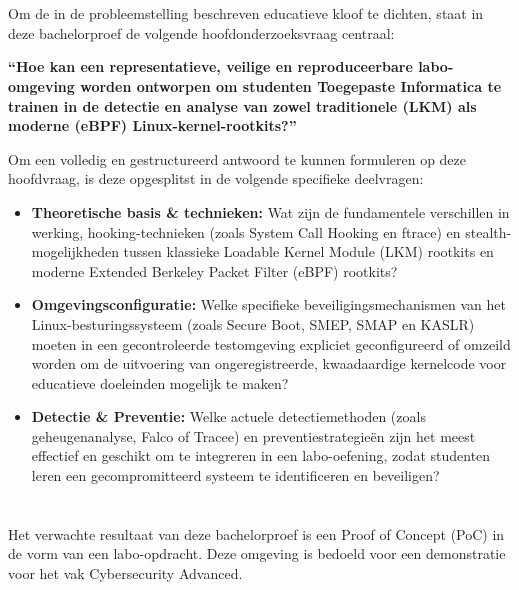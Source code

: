 \section{}%
\label{sec:onderzoeksvraag}

Om de in de probleemstelling beschreven educatieve kloof te dichten, staat in deze bachelorproef de volgende hoofdonderzoeksvraag centraal:

\textbf{``Hoe kan een representatieve, veilige en reproduceerbare labo-omgeving worden ontworpen om studenten Toegepaste Informatica te trainen in de detectie en analyse van zowel traditionele (LKM) als moderne (eBPF) Linux-kernel-rootkits?''}

Om een volledig en gestructureerd antwoord te kunnen formuleren op deze hoofdvraag, is deze opgesplitst in de volgende specifieke deelvragen:
\begin{itemize}
    \item \textbf{Theoretische basis \& technieken:} Wat zijn de fundamentele verschillen in werking, hooking-technieken (zoals System Call Hooking en ftrace) en stealth-mogelijkheden tussen klassieke Loadable Kernel Module (LKM) rootkits en moderne Extended Berkeley Packet Filter (eBPF) rootkits?
    \item \textbf{Omgevingsconfiguratie:} Welke specifieke beveiligingsmechanismen van het Linux-besturingssysteem (zoals Secure Boot, SMEP, SMAP en KASLR) moeten in een gecontroleerde testomgeving expliciet geconfigureerd of omzeild worden om de uitvoering van ongeregistreerde, kwaadaardige kernelcode voor educatieve doeleinden mogelijk te maken?
    \item \textbf{Detectie \& Preventie:} Welke actuele detectiemethoden (zoals geheugenanalyse, Falco of Tracee) en preventiestrategieën zijn het meest effectief en geschikt om te integreren in een labo-oefening, zodat studenten leren een gecompromitteerd systeem te identificeren en beveiligen?
\end{itemize}

\section{}%
\label{sec:onderzoeksdoelstelling}
Het verwachte resultaat van deze bachelorproef is een Proof of Concept (PoC) in de vorm van een labo-opdracht. Deze omgeving is bedoeld voor een demonstratie voor het vak Cybersecurity Advanced.

